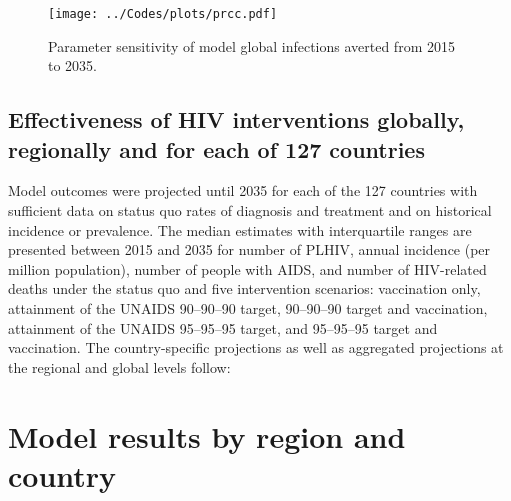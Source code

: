 \documentclass[11pt]{article}
\begin{document}
\begin{figure}
  \centering
  \texttt{[image: ../Codes/plots/prcc.pdf]}
  \caption{Parameter sensitivity of model global infections averted
    from 2015 to 2035.}
  \label{PRCCs}
\end{figure}


\subsection{Effectiveness of HIV interventions globally, regionally
  and for each of 127 countries}

Model outcomes were projected until 2035 for each of the 127 countries
with sufficient data on status quo rates of diagnosis and treatment
and on historical incidence or prevalence. The median estimates with
interquartile ranges are presented between 2015 and 2035 for number of
PLHIV, annual incidence (per million population), number of people
with AIDS, and number of HIV-related deaths under the status quo and
five intervention scenarios: vaccination only, attainment of the
UNAIDS 90--90--90 target, 90--90--90 target and vaccination, attainment of
the UNAIDS 95--95--95 target, and 95--95--95 target and vaccination.  The
country-specific projections as well as aggregated projections at the
regional and global levels follow:







\appendix
\clearpage
\section{Model results by region and country}


\end{document}
